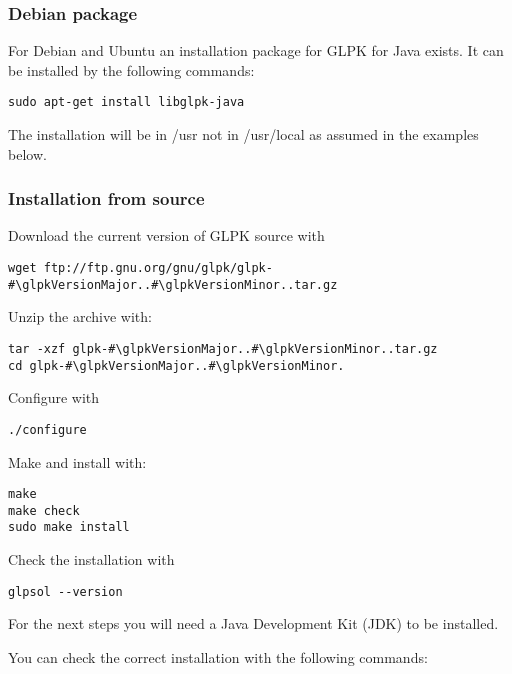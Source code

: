 \documentclass[a4paper,11pt]{report}
\newcommand{\glpkVersionMajor}{4}
\newcommand{\glpkVersionMinor}{63}
\begin{document}
\subsubsection{Debian package}

For Debian and Ubuntu an installation package for GLPK for Java exists.
It can be installed by the following commands:

\begin{lstlisting}
sudo apt-get install libglpk-java
\end{lstlisting}

The installation will be in /usr not in /usr/local as assumed in the examples
below.

\subsubsection{Installation from source}

Download the current version of GLPK source with

\begin{lstlisting}
wget ftp://ftp.gnu.org/gnu/glpk/glpk-#\glpkVersionMajor..#\glpkVersionMinor..tar.gz
\end{lstlisting}

Unzip the archive with:

\begin{lstlisting}
tar -xzf glpk-#\glpkVersionMajor..#\glpkVersionMinor..tar.gz
cd glpk-#\glpkVersionMajor..#\glpkVersionMinor.
\end{lstlisting}

Configure with

\begin{lstlisting}
./configure
\end{lstlisting}

Make and install with:

\begin{lstlisting}
make
make check
sudo make install
\end{lstlisting}

Check the installation with

\begin{lstlisting}
glpsol --version
\end{lstlisting}

For the next steps you will need a Java Development Kit (JDK) to be installed.

You can check the correct installation with the following commands:
\end{document}
